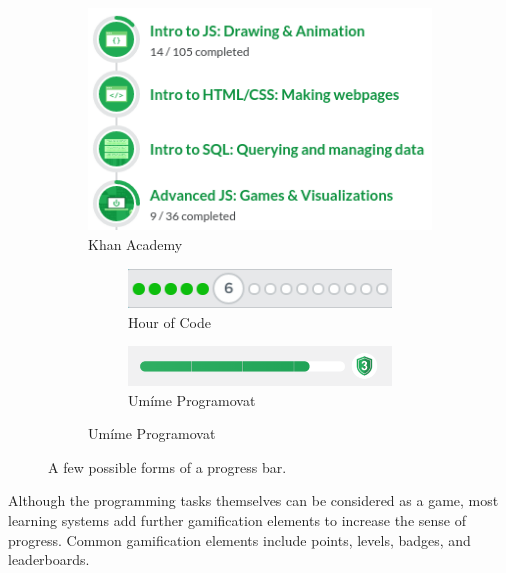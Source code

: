 \begin{figure}[htb]
\centering
\begin{subfigure}{.48\textwidth}
\centering
\includegraphics[width=.9\textwidth]{img/ka-skills}
\caption{Khan Academy}
\end{subfigure}
\begin{subfigure}{.48\textwidth}
\centering
\begin{subfigure}{\textwidth}
\includegraphics[width=.9\textwidth]{img/hour-of-code-progress}
\caption{Hour of Code}
\end{subfigure}
\bigskip
\vspace{1mm}
\begin{subfigure}{\textwidth}
\includegraphics[width=.9\textwidth]{img/umime-progressbar-green}
\caption{Umíme Programovat} %
\end{subfigure}
\end{subfigure}
\caption{A few possible forms of a progress bar.}
\label{fig:progress-visualization}
\end{figure}



Although the programming tasks themselves can be considered as a game,
most learning systems add further gamification elements to increase the sense
of progress.
Common gamification elements include points, levels, badges, and leaderboards.


